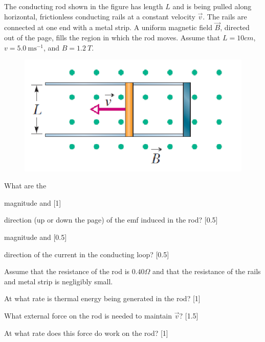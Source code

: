 \begin{problem}
    The conducting rod shown in the figure has length $L$ and is being pulled along horizontal, frictionless conducting rails at a constant velocity $\vec{v}$. The rails are connected at one end with a metal strip. A uniform magnetic field $\vec{B}$, directed out of the page, fills the region in which the rod moves. Assume that $L = 10 \unit{cm}$, $v = \qty{5.0}{\m\s^{-1}}$, and $B = \qty{1.2}{T}$. 
    \begin{figure}[H]
        \centering
        \includegraphics{spho_book_TYS_images/2021SPhO_3.png}
    \end{figure}
    What are the
    \begin{subproblemalph}
        \item magnitude and \hfill [1]
        \item direction (up or down the page) of the emf induced in the rod? \hfill [0.5]
        \item magnitude and \hfill [0.5]
        \item direction of the current in the conducting loop? \hfill [0.5]
    \end{subproblemalph}
    Assume that the resistance of the rod is $0.40 \Omega$ and that the resistance of the rails and metal strip is negligibly small.
    \begin{subproblemalph}
        \setcounter{enumi}{4}
        \item At what rate is thermal energy being generated in the rod? \hfill [1]
        \item What external force on the rod is needed to maintain $\vec{v}$? \hfill [1.5]
        \item At what rate does this force do work on the rod? \hfill [1]
    \end{subproblemalph}
\end{problem}
\newpage
